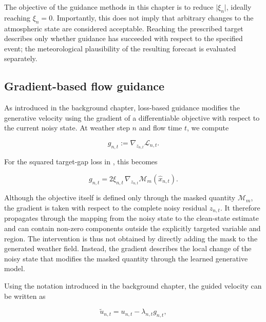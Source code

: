 The objective of the guidance methods in this chapter is to reduce
\(\lvert\xi_n\rvert\), ideally reaching \(\xi_n=0\). Importantly, this does
not imply that arbitrary changes to the atmospheric state are considered
acceptable. Reaching the prescribed target describes only whether guidance
has succeeded with respect to the specified event; the meteorological
plausibility of the resulting forecast is evaluated separately.

\subsection{Gradient-based flow guidance}
\label{sec:gradient-flow-guidance}

As introduced in the background chapter, loss-based guidance modifies the
generative velocity using the gradient of a differentiable objective with
respect to the current noisy state. At weather step \(n\) and flow time \(t\),
we compute

\begin{equation}
    g_{n,t}
    :=
    \nabla_{z_{n,t}}
    \mathcal{L}_{n,t}.
    \label{eq:guidance-gradient}
\end{equation}

For the squared target-gap loss in , this becomes

\begin{equation}
    g_{n,t}
    =
    2\xi_{n,t}\,
    \nabla_{z_{n,t}}
    \mathcal{M}_m(\hat{x}_{n,t}).
    \label{eq:guidance-gradient-expanded}
\end{equation}

Although the objective itself is defined only through the masked quantity
\(\mathcal{M}_m\), the gradient is taken with respect to the complete noisy
residual \(z_{n,t}\). It therefore propagates through the mapping from the
noisy state to the clean-state estimate and can contain non-zero components
outside the explicitly targeted variable and region. The intervention is thus
not obtained by directly adding the mask to the generated weather field.
Instead, the gradient describes the local change of the noisy state that
modifies the masked quantity through the learned generative model.

Using the notation introduced in the background chapter, the guided velocity
can be written as

\begin{equation}
    \tilde{u}_{n,t}
    =
    u_{n,t}
    -
    \lambda_{n,t} g_{n,t},
    \label{eq:target-driven-guided-velocity}
\end{equation}

